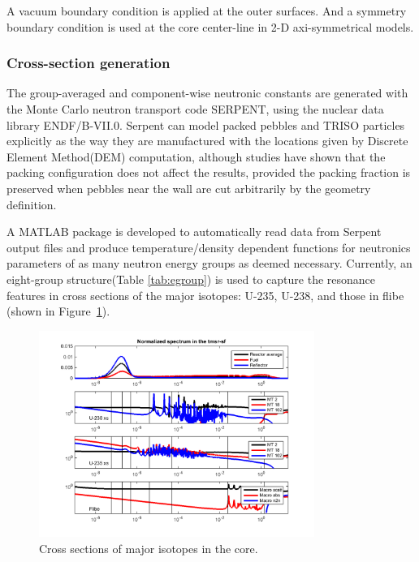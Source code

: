 \documentclass{elsarticle}
\begin{document}
A vacuum boundary condition is applied at the outer surfaces. And a symmetry boundary condition is used at the core center-line in 2-D axi-symmetrical models.



\subsubsection{Cross-section generation}
The group-averaged and component-wise neutronic constants are generated with the Monte Carlo neutron transport code SERPENT\cite{Serpent2015}, using the nuclear data library ENDF/B-VII.0.  
Serpent can model packed pebbles and TRISO particles explicitly as the way they are manufactured with the locations given by Discrete Element Method(DEM) computation, although studies\cite{Fratoni2007} have shown that the packing configuration does not affect the results, provided the packing fraction is preserved when pebbles near the wall are cut arbitrarily by the geometry definition. 

A MATLAB package is developed to automatically read data from Serpent output files and produce temperature/density dependent functions for neutronics parameters of as many neutron energy groups as deemed necessary. Currently, an eight-group structure(Table \ref{tab:egroup}) is used to capture the resonance features in cross sections of the major isotopes: U-235, U-238, and those in flibe (shown in Figure~\ref{fig:xs_isotope}).
\begin{figure}[h]
  \centering
  \includegraphics[width=0.8\textwidth]{./images/diffusion/isotope_XS.png}
  \caption{Cross sections of major isotopes in the core.}
  \label{fig:xs_isotope}
\end{figure}
\end{document}
